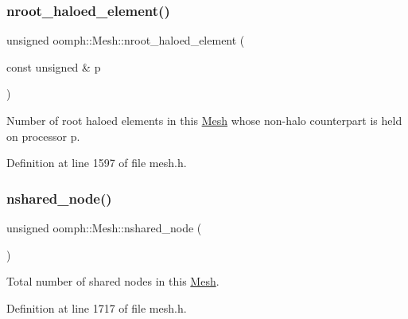 \mbox{\label{classoomph_1_1Mesh_a22026b3f1c11c28142bc9cbeb2214736}} 
\subsubsection{\texorpdfstring{nroot\+\_\+haloed\+\_\+element()}{nroot\_haloed\_element()}\hspace{0.1cm}{\footnotesize\ttfamily [2/2]}}
{\footnotesize\ttfamily unsigned oomph\+::\+Mesh\+::nroot\+\_\+haloed\+\_\+element (\begin{DoxyParamCaption}\item[{const unsigned \&}]{p }\end{DoxyParamCaption})\hspace{0.3cm}{\ttfamily [inline]}}



Number of root haloed elements in this \hyperlink{classoomph_1_1Mesh}{Mesh} whose non-\/halo counterpart is held on processor p. 



Definition at line 1597 of file mesh.\+h.

\mbox{\label{classoomph_1_1Mesh_aeca9041d73b9641ca1361763401b4799}} 
\subsubsection{\texorpdfstring{nshared\+\_\+node()}{nshared\_node()}\hspace{0.1cm}{\footnotesize\ttfamily [1/2]}}
{\footnotesize\ttfamily unsigned oomph\+::\+Mesh\+::nshared\+\_\+node (\begin{DoxyParamCaption}{ }\end{DoxyParamCaption})\hspace{0.3cm}{\ttfamily [inline]}}



Total number of shared nodes in this \hyperlink{classoomph_1_1Mesh}{Mesh}. 



Definition at line 1717 of file mesh.\+h.



